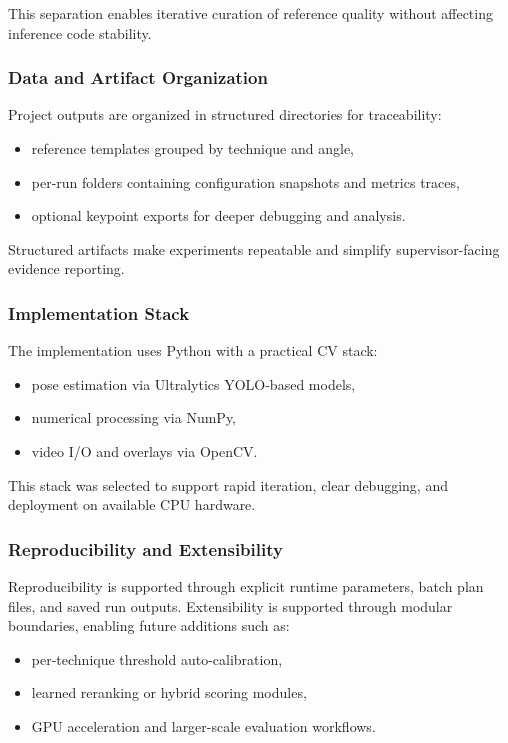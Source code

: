 \documentclass[12pt]{article}
\begin{document}
{This separation enables iterative curation of reference quality without affecting inference code stability.

\subsubsection{Data and Artifact Organization}

Project outputs are organized in structured directories for traceability:

\begin{itemize}
    \item reference templates grouped by technique and angle,
    \item per-run folders containing configuration snapshots and metrics traces,
    \item optional keypoint exports for deeper debugging and analysis.
\end{itemize}

Structured artifacts make experiments repeatable and simplify supervisor-facing evidence reporting.

\subsubsection{Implementation Stack}

The implementation uses Python with a practical CV stack:

\begin{itemize}
    \item pose estimation via Ultralytics YOLO-based models,
    \item numerical processing via NumPy,
    \item video I/O and overlays via OpenCV.
\end{itemize}

This stack was selected to support rapid iteration, clear debugging, and deployment on available CPU hardware.

\subsubsection{Reproducibility and Extensibility}

Reproducibility is supported through explicit runtime parameters, batch plan files, and saved run outputs. Extensibility is supported through modular boundaries, enabling future additions such as:

\begin{itemize}
    \item per-technique threshold auto-calibration,
    \item learned reranking or hybrid scoring modules,
    \item GPU acceleration and larger-scale evaluation workflows.
\end{itemize}

}
\end{document}
